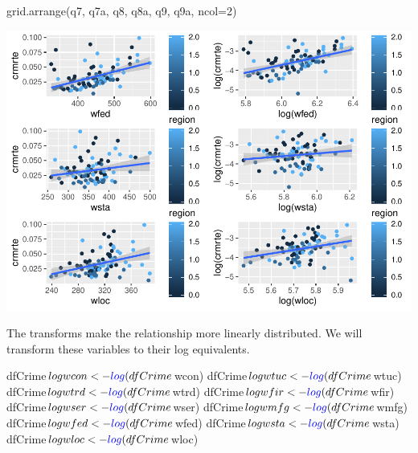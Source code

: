 \documentclass[]{article}
\newenvironment{Shaded}{}{}
\newcommand{\DataTypeTok}[1]{#1}
\newcommand{\DecValTok}[1]{#1}
\newcommand{\KeywordTok}[1]{\textcolor[rgb]{0.00,0.00,1.00}{#1}}
\newcommand{\NormalTok}[1]{#1}
\newcommand{\OperatorTok}[1]{#1}
\begin{document}
\begin{Shaded}
\begin{Highlighting}[]
\KeywordTok{grid.arrange}\NormalTok{(q7, q7a, q8, q8a, q9, q9a, }\DataTypeTok{ncol=}\DecValTok{2}\NormalTok{)}
\end{Highlighting}
\end{Shaded}

\includegraphics{Bagnard_Gaustad_Hartman_Leung_Lab_3_files/figure-latex/unnamed-chunk-50-3.pdf}

The transforms make the relationship more linearly distributed. We will
transform these variables to their log equivalents.

\begin{Shaded}
\begin{Highlighting}[]
\NormalTok{dfCrime}\OperatorTok{$}\NormalTok{logwcon<-}\KeywordTok{log}\NormalTok{(dfCrime}\OperatorTok{$}\NormalTok{wcon)}
\NormalTok{dfCrime}\OperatorTok{$}\NormalTok{logwtuc<-}\KeywordTok{log}\NormalTok{(dfCrime}\OperatorTok{$}\NormalTok{wtuc)}
\NormalTok{dfCrime}\OperatorTok{$}\NormalTok{logwtrd<-}\KeywordTok{log}\NormalTok{(dfCrime}\OperatorTok{$}\NormalTok{wtrd)}
\NormalTok{dfCrime}\OperatorTok{$}\NormalTok{logwfir<-}\KeywordTok{log}\NormalTok{(dfCrime}\OperatorTok{$}\NormalTok{wfir)}
\NormalTok{dfCrime}\OperatorTok{$}\NormalTok{logwser<-}\KeywordTok{log}\NormalTok{(dfCrime}\OperatorTok{$}\NormalTok{wser)}
\NormalTok{dfCrime}\OperatorTok{$}\NormalTok{logwmfg<-}\KeywordTok{log}\NormalTok{(dfCrime}\OperatorTok{$}\NormalTok{wmfg)}
\NormalTok{dfCrime}\OperatorTok{$}\NormalTok{logwfed<-}\KeywordTok{log}\NormalTok{(dfCrime}\OperatorTok{$}\NormalTok{wfed)}
\NormalTok{dfCrime}\OperatorTok{$}\NormalTok{logwsta<-}\KeywordTok{log}\NormalTok{(dfCrime}\OperatorTok{$}\NormalTok{wsta)}
\NormalTok{dfCrime}\OperatorTok{$}\NormalTok{logwloc<-}\KeywordTok{log}\NormalTok{(dfCrime}\OperatorTok{$}\NormalTok{wloc)}
\end{Highlighting}
\end{Shaded}
\end{document}
